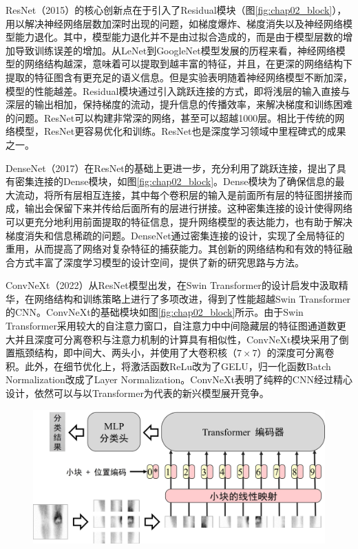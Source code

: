 ResNet\cite{he2016deep}（2015）的核心创新点在于引入了Residual模块（图\ref{fig:chap02_block}），用以解决神经网络层数加深时出现的问题，如梯度爆炸、梯度消失以及神经网络模型能力退化。其中，模型能力退化并不是由过拟合造成的，而是由于模型层数的增加导致训练误差的增加。从LeNet到GoogleNet模型发展的历程来看，神经网络模型的网络结构越深，意味着可以提取到越丰富的特征，并且，在更深的网络结构下提取的特征图含有更充足的语义信息。但是实验表明随着神经网络模型不断加深，模型的性能越差。Residual模块通过引入跳跃连接的方式，即将浅层的输入直接与深层的输出相加，保持梯度的流动，提升信息的传播效率，来解决梯度和训练困难的问题。ResNet可以构建非常深的网络，甚至可以超越1000层。相比于传统的网络模型，ResNet更容易优化和训练。ResNet也是深度学习领域中里程碑式的成果之一。

DenseNet\cite{huang2017densely}（2017）在ResNet的基础上更进一步，充分利用了跳跃连接，提出了具有密集连接的Dense模块，如图\ref{fig:chap02_block}。Dense模块为了确保信息的最大流动，将所有层相互连接，其中每个卷积层的输入是前面所有层的特征图拼接而成，输出会保留下来并传给后面所有的层进行拼接。这种密集连接的设计使得网络可以更充分地利用前面提取的特征信息，提升网络模型的表达能力，也有助于解决梯度消失和信息稀疏的问题。DenseNet通过密集连接的设计，实现了全局特征的重用，从而提高了网络对复杂特征的捕获能力。其创新的网络结构和有效的特征融合方式丰富了深度学习模型的设计空间，提供了新的研究思路与方法。

ConvNeXt\cite{liu2022convnet}（2022）从ResNet模型出发，在Swin Transformer\cite{liu2021swin}的设计启发中汲取精华，在网络结构和训练策略上进行了多项改进，得到了性能超越Swin Transformer的CNN。ConvNeXt的基础模块如图\ref{fig:chap02_block}所示。由于Swin Transformer采用较大的自注意力窗口，自注意力中中间隐藏层的特征图通道数更大并且深度可分离卷积与注意力机制的计算具有相似性，ConvNeXt模块采用了倒置瓶颈结构，即中间大、两头小，并使用了大卷积核（\(7\times7\)）的深度可分离卷积。此外，在细节优化上，将激活函数ReLu改为了GELU，归一化函数Batch Normalization\cite{ioffe2015batch}改成了Layer Normalization。ConvNeXt表明了纯粹的CNN经过精心设计，依然可以与以Transformer为代表的新兴模型展开竞争。

\begin{figure}[htbp]
  \centering
  \includegraphics[width=\textwidth]{figures/chap02_vit.jpg}
  \label{fig:chap02_vit}
\end{figure}

